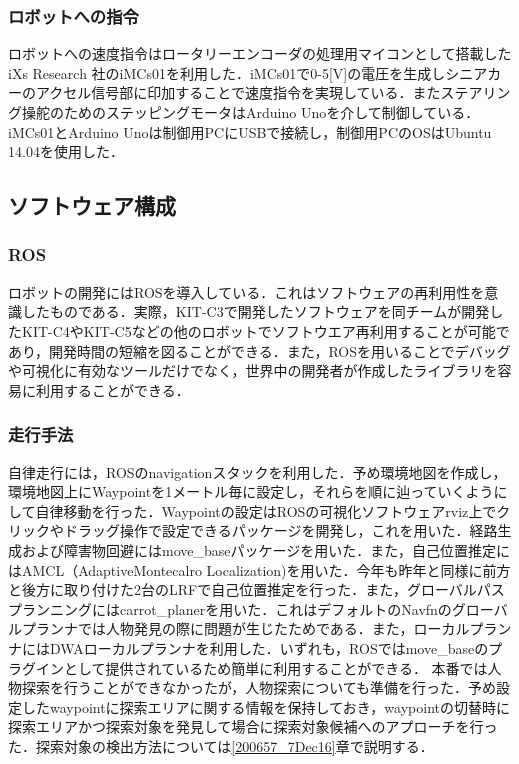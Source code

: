 \documentclass[10pt,a4paper]{jarticle}
\begin{document}
\subsubsection{ロボットへの指令}
ロボットへの速度指令はロータリーエンコーダの処理用マイコンとして搭載した iXs Research 社のiMCs01を利用した．iMCs01で0-5[V]の電圧を生成しシニアカーのアクセル信号部に印加することで速度指令を実現している．またステアリング操舵のためのステッピングモータはArduino Unoを介して制御している．iMCs01とArduino Unoは制御用PCにUSBで接続し，制御用PCのOSはUbuntu 14.04を使用した．

\subsection{ソフトウェア構成}
\subsubsection{ROS}
ロボットの開発にはROS\cite{ros}を導入している．これはソフトウェアの再利用性を意識したものである．実際，KIT-C3で開発したソフトウェアを同チームが開発したKIT-C4やKIT-C5などの他のロボットでソフトウエア再利用することが可能であり，開発時間の短縮を図ることができる．また，ROSを用いることでデバッグや可視化に有効なツールだけでなく，世界中の開発者が作成したライブラリを容易に利用することができる．

\subsubsection{走行手法}
自律走行には，ROSのnavigationスタックを利用した．予め環境地図を作成し，環境地図上にWaypointを1メートル毎に設定し，それらを順に辿っていくようにして自律移動を行った．Waypointの設定はROSの可視化ソフトウェアrviz上でクリックやドラッグ操作で設定できるパッケージを開発し，これを用いた．経路生成および障害物回避にはmove\_baseパッケージを用いた．また，自己位置推定にはAMCL（AdaptiveMontecalro Localization)を用いた．今年も昨年と同様に前方と後方に取り付けた2台のLRFで自己位置推定を行った．また，グローバルパスプランニングにはcarrot\_planerを用いた．これはデフォルトのNavfnのグローバルプランナでは人物発見の際に問題が生じたためである．また，ローカルプランナにはDWAローカルプランナを利用した．いずれも，ROSではmove\_baseのプラグインとして提供されているため簡単に利用することができる．
本番では人物探索を行うことができなかったが，人物探索についても準備を行った．予め設定したwaypointに探索エリアに関する情報を保持しておき，waypointの切替時に探索エリアかつ探索対象を発見して場合に探索対象候補へのアプローチを行った．探索対象の検出方法については\ref{200657_7Dec16}章で説明する．
\end{document}
